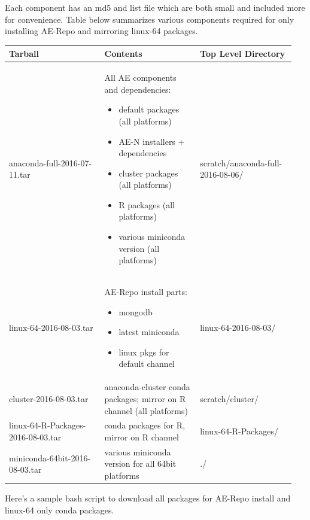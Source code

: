 \documentclass[letterpaper,10pt,openany,oneside]{sphinxmanual}
\begin{document}
Each component has an md5 and list file which are both small and included more for convenience. Table below
summarizes various components required for only installing AE-Repo and mirroring linux-64 packages.

\begin{tabular}{|p{0.317\linewidth}|p{0.317\linewidth}|p{0.317\linewidth}|}
\hline
\textsf{\relax 
Tarball
} & \textsf{\relax 
Contents
} & \textsf{\relax 
Top Level Directory
}\\
\hline
anaconda-full-2016-07-11.tar
 & 
All AE components and dependencies:
\begin{itemize}
\item {} 
default packages (all platforms)

\item {} 
AE-N installers + dependencies

\item {} 
cluster packages (all platforms)

\item {} 
R packages (all platforms)

\item {} 
various miniconda version (all platforms)

\end{itemize}
 & 
scratch/anaconda-full-2016-08-06/
\\
\hline
linux-64-2016-08-03.tar
 & 
AE-Repo install parts:
\begin{itemize}
\item {} 
mongodb

\item {} 
latest miniconda

\item {} 
linux pkgs for default channel

\end{itemize}
 & 
linux-64-2016-08-03/
\\
\hline
cluster-2016-08-03.tar
 & 
anaconda-cluster conda packages; mirror on
R channel (all platforms)
 & 
scratch/cluster/
\\
\hline
linux-64-R-Packages-2016-08-03.tar
 & 
conda packages for R, mirror on R channel
 & 
linux-64-R-Packages/
\\
\hline
miniconda-64bit-2016-08-03.tar
 & 
various miniconda version for all 64bit
platforms
 & 
./
\\
\hline\end{tabular}


Here's a sample bash script to download all packages for AE-Repo install and linux-64 only conda packages.
\end{document}
